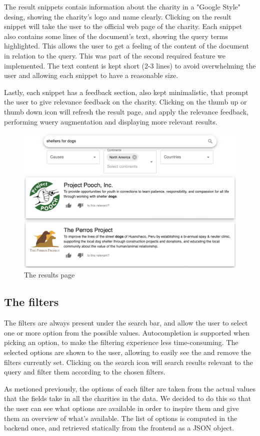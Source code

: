 \documentclass[unicode,9pt,a4paper,oneside,numbers=endperiod,openany]{scrartcl}
\begin{document}
The result snippets contais information about the charity in a "Google Style" desing, showing the charity's logo and name clearly.
Clicking on the result snippet will take the user to the official web page of the charity.
Each snippet also contains some lines of the document's text, showing the query terms highlighted. This allows the user to
get a feeling of the content of the document in relation to the query. This was part of the second required feature we implemented.
The text content is kept short (2-3 lines) to avoid overwhelming the user and allowing each snippet to have a reasonable size.

Lastly, each snippet has a feedback section, also kept minimalistic, that prompt the user to give relevance feedback on the charity.
Clicking on the thumb up or thumb down icon will refresh the result page, and apply the relevance feedback, performing wuery augmentation and displaying more relevant results.

\begin{figure}[h]
    \centering
    \includegraphics[width=0.6\linewidth]{fig/results-page.png}
    \caption{The results page}
\end{figure}


\subsection{The filters}

The filters are always present under the search bar, and allow the user to select one or more option from the possible values.
Autocompletion is supported when picking an option, to make the filtering experience less time-consuming.
The selected options are shown to the user, allowing to easily see the and remove the filters currently set.
Clicking on the search icon will search results relevant to the query and filter them according to the chosen filters.

As metioned previously, the options of each filter are taken from the actual values that the fields take in all the charities in the data.
We decided to do this so that the user can see what options are available in order to inspire them and give them an overview of what's available.
The list of options is computed in the backend once, and retrieved statically from the frontend as a JSON object.
\end{document}
